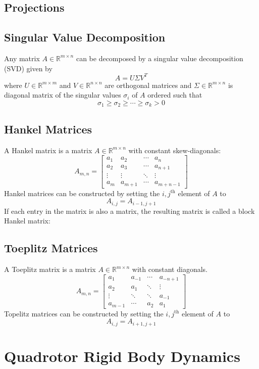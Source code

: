 \subsection{Projections}


\subsection{Singular Value Decomposition}
Any matrix $A \in \mathbb{R}^{m\times n}$ can be decomposed by a singular value decomposition (SVD) given by
\begin{equation*}
A = U\Sigma V^T
\end{equation*}
where $U \in \mathbb{R}^{m\times m}$ and $V \in \mathbb{R}^{n\times n}$ are orthogonal matrices and $\Sigma \in \mathbb{R}^{m\times n}$ is diagonal matrix of the singular values $\sigma_i$ of $A$ ordered such that
\begin{equation*}
\sigma_1 \geq \sigma_2 \geq \cdots \geq \sigma_k > 0
\end{equation*}


\subsection{Hankel Matrices}
A Hankel matrix is a matrix $A \in \mathbb{R}^{m\times n}$ with constant skew-diagonals:
\begin{equation*}
A_{m,n} = \begin{bmatrix}
a_1 & a_2 & \cdots & a_n\\
a_2 & a_3 & \cdots & a_{n+1}\\
\vdots & \vdots & \ddots & \vdots\\
a_m & a_{m+1} & \cdots & a_{m+n-1}
\end{bmatrix}
\end{equation*}
Hankel matrices can be constructed by setting the $i,j^{\mbox{th}}$ element of $A$ to
\begin{equation*}
A_{i,j} = A_{i-1, j+1}
\end{equation*}
If each entry in the matrix is also a matrix, the resulting matrix is called a block Hankel matrix:


\subsection{Toeplitz Matrices}
A Toeplitz matrix is a matrix $A\in\mathbb{R}^{m\times n}$ with constant diagonals. 
\begin{equation*}
A_{m,n} = \begin{bmatrix}
a_1 & a_{-1} & \cdots & a_{-n+1}\\
a_2 & a_1 & \ddots & \vdots\\
\vdots & \ddots & \ddots & a_{-1}\\
a_{m-1} & \cdots & a_2 & a_1
\end{bmatrix}
\end{equation*}
Topelitz matrices can be constructed by setting the $i,j^{\mbox{th}}$ element of $A$ to
\begin{equation*}
A_{i,j} = A_{i+1, j+1}
\end{equation*}

\section{Quadrotor Rigid Body Dynamics}